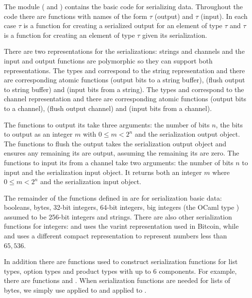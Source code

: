The module  ( and ) contains the basic code for serializing data.
Throughout the code there are functions with names of the form {}$\tau$ (output)
and {}$\tau$ (input).
In each case {}$\tau$ is a function for creating a serialized output for an
element of type $\tau$
and {}$\tau$ is a function for creating an element of type $\tau$ given its serialization.

There are two representations for the serializations: strings and channels
and the input and output functions are polymorphic so they can support both representations.
The types  and  correspond to the string representation
and there are corresponding atomic
functions  (output bits to a string buffer),  (flush output to string buffer) and  (input bits from a string).
The types  and  correspond to the channel representation
and there are corresponding atomic
functions  (output bits to a channel),  (flush output channel) and  (input bits from a channel).

The functions to output its take three arguments: the number of bits $n$, the bits to output as an integer $m$ with $0\leq m < 2^n$ and the serialization output object.
The functions to flush the output takes the serialization output object
and ensures any remaining its are output, assuming the remaining its are zero.
The functions to input its from a channel take two arguments: the number of bits $n$ to input and the serialization input object. It returns both an integer $m$ where $0\leq m < 2^n$ and the serialization input object.

The remainder of the functions defined in  are for
serialization basic data: booleans, bytes, 32-bit integers, 64-bit integers, big integers (the OCaml type ) assumed to be 256-bit integers and strings.
There are also other serialization functions for integers:  and  uses the varint representation used in Bitcoin, while  and  uses a different compact representation to represent numbers less than $65,536$.

In addition there are functions used to construct serialization functions
for list types, option types and product types with up to $6$ components.
For example, there are functions  and .
When serialization functions are needed for lists of bytes, we simply
use  applied to 
and  applied to .

